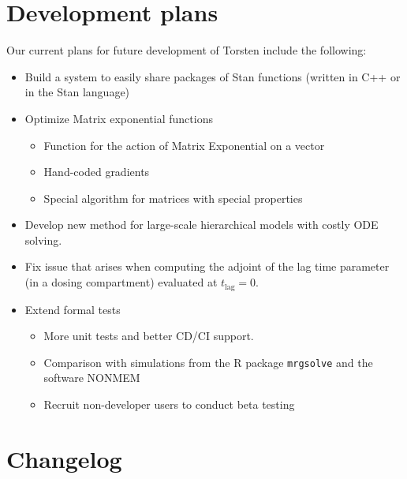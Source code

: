 \documentclass[10pt, reqno, oneside]{amsbook}
\numberwithin{equation}{chapter}
\numberwithin{figure}{chapter}
\numberwithin{table}{chapter}
\theoremstyle{remark}
\begin{document}
\section{Development plans}
\label{dev_plans}
Our current plans for future development of Torsten include the
following:
\begin{itemize}
\item Build a system to easily share packages of Stan functions
(written in C++ or in the Stan language)
\item Optimize Matrix exponential functions
\begin{itemize}
\item Function for the action of Matrix Exponential on a vector
\item Hand-coded gradients
\item Special algorithm for matrices with special properties
\end{itemize}
\item Develop new method for large-scale hierarchical models with costly
ODE solving.
\item Fix issue that arises when computing the adjoint of the lag time
parameter (in a dosing compartment) evaluated at \(t_{\text{lag}} = 0\).
\item Extend formal tests
\begin{itemize}
\item More unit tests and better CD/CI support.
\item Comparison with simulations from the R package
\texttt{mrgsolve} and the software NONMEM\textregistered{}
\item Recruit non-developer users to conduct beta testing
\end{itemize}
\end{itemize}

\section*{Changelog}
\label{changelog}
\end{document}
